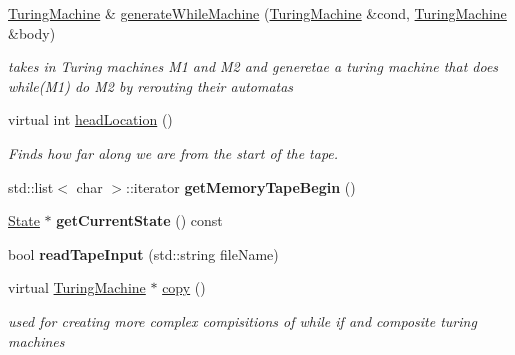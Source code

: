 \begin{DoxyCompactItemize}
\mbox{\label{class_turing_machine_a8798c2b0970f6f3abf5edf6d08e3d4c0}} 
\mbox{\hyperlink{class_turing_machine}{Turing\+Machine}} \& \mbox{\hyperlink{class_turing_machine_a8798c2b0970f6f3abf5edf6d08e3d4c0}{generate\+While\+Machine}} (\mbox{\hyperlink{class_turing_machine}{Turing\+Machine}} \&cond, \mbox{\hyperlink{class_turing_machine}{Turing\+Machine}} \&body)
\begin{DoxyCompactList}\small\item\em takes in Turing machines M1 and M2 and generetae a turing machine that does while(\+M1) do M2 by rerouting their automatas \end{DoxyCompactList}\item 
\mbox{\label{class_turing_machine_a0264de81a9a8f060fecc049db6da5493}} 
virtual int \mbox{\hyperlink{class_turing_machine_a0264de81a9a8f060fecc049db6da5493}{head\+Location}} ()
\begin{DoxyCompactList}\small\item\em Finds how far along we are from the start of the tape. \end{DoxyCompactList}\item 
\mbox{\label{class_turing_machine_a8b5fdcf4377e6c13f6723b47d7bff119}} 
std\+::list$<$ char $>$\+::iterator {\bfseries get\+Memory\+Tape\+Begin} ()
\item 
\mbox{\label{class_turing_machine_a66a24e2d89e421fc4d150bfaef8154f1}} 
\mbox{\hyperlink{class_state}{State}} $\ast$ {\bfseries get\+Current\+State} () const
\item 
\mbox{\label{class_turing_machine_ae07c4323b8af8c62361d3e7160df3c85}} 
bool {\bfseries read\+Tape\+Input} (std\+::string file\+Name)
\item 
\mbox{\label{class_turing_machine_a034ccd2c2c09b538cc3eeec824f16e1a}} 
virtual \mbox{\hyperlink{class_turing_machine}{Turing\+Machine}} $\ast$ \mbox{\hyperlink{class_turing_machine_a034ccd2c2c09b538cc3eeec824f16e1a}{copy}} ()
\begin{DoxyCompactList}\small\item\em used for creating more complex compisitions of while if and composite turing machines \end{DoxyCompactList}\end{DoxyCompactItemize}
